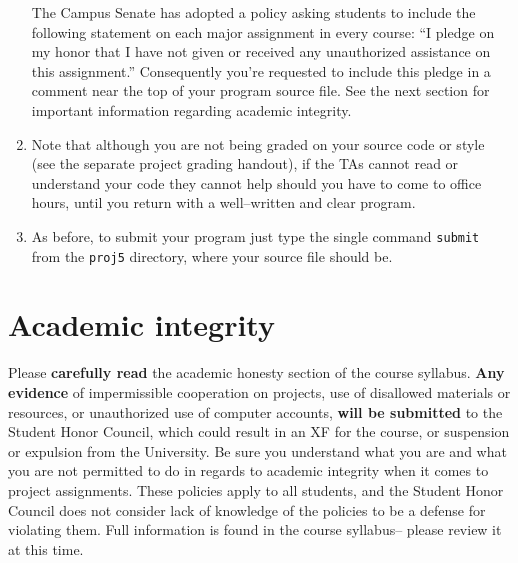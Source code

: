 \documentclass[11pt]{article}
\begin{document}
\begin{enumerate}
            The Campus Senate has adopted a policy asking students to
            include the following statement on each major assignment in
            every course: ``I pledge on my honor that I have not given or
            received any unauthorized assistance on this assignment.''
            Consequently you're requested to include this pledge in a
            comment near the top of your program source file.  See the next
            section for important information regarding academic integrity.

      \item Note that although you are not being graded on your source code
            or style (see the separate project grading handout), if the TAs
            cannot read or understand your code they cannot help should you
            have to come to office hours, until you return with a
            well--written and clear program.

      \item As before, to submit your program just type the single command
            \texttt{submit} from the \texttt{proj5} directory, where your
            source file should be.

    \end{enumerate}

    \vspace{-4.5mm}

  \section{Academic integrity}

    Please \textbf{carefully read} the academic honesty section of the course
  syllabus.  \textbf{Any evidence} of impermissible cooperation on projects,
  use of disallowed materials or resources, or unauthorized use of computer
  accounts, \textbf{will be submitted} to the Student Honor Council, which
  could result in an XF for the course, or suspension or expulsion from the
  University.  Be sure you understand what you are and what you are not
  permitted to do in regards to academic integrity when it comes to project
  assignments.  These policies apply to all students, and the Student Honor
  Council does not consider lack of knowledge of the policies to be a
  defense for violating them.  Full information is found in the course
  syllabus-- please review it at this time.
\end{document}
